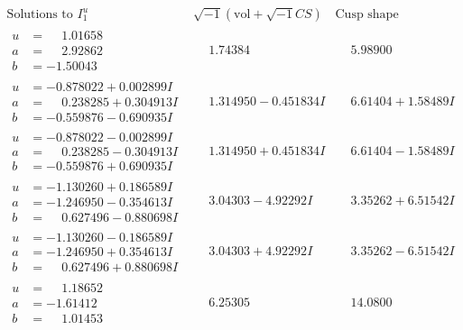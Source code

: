 \documentclass[1p]{elsarticle_modified}
\theoremstyle{definition}
\newcommand{\I}{\sqrt{-1}}
\begin{document}
$$\begin{array}{c|c|c}  
\text{Solutions to }I^u_{1}& \I (\text{vol} + \sqrt{-1}CS) & \text{Cusp shape}\\
 \hline 
\begin{aligned}
u &= \phantom{-}1.01658\phantom{ +0.000000I} \\
a &= \phantom{-}2.92862\phantom{ +0.000000I} \\
b &= -1.50043\phantom{ +0.000000I}\end{aligned}
 & \phantom{-}1.74384\phantom{ +0.000000I} & \phantom{-}5.98900\phantom{ +0.000000I} \\ \hline\begin{aligned}
u &= -0.878022 + 0.002899 I \\
a &= \phantom{-}0.238285 + 0.304913 I \\
b &= -0.559876 - 0.690935 I\end{aligned}
 & \phantom{-}1.314950 - 0.451834 I & \phantom{-}6.61404 + 1.58489 I \\ \hline\begin{aligned}
u &= -0.878022 - 0.002899 I \\
a &= \phantom{-}0.238285 - 0.304913 I \\
b &= -0.559876 + 0.690935 I\end{aligned}
 & \phantom{-}1.314950 + 0.451834 I & \phantom{-}6.61404 - 1.58489 I \\ \hline\begin{aligned}
u &= -1.130260 + 0.186589 I \\
a &= -1.246950 - 0.354613 I \\
b &= \phantom{-}0.627496 - 0.880698 I\end{aligned}
 & \phantom{-}3.04303 - 4.92292 I & \phantom{-}3.35262 + 6.51542 I \\ \hline\begin{aligned}
u &= -1.130260 - 0.186589 I \\
a &= -1.246950 + 0.354613 I \\
b &= \phantom{-}0.627496 + 0.880698 I\end{aligned}
 & \phantom{-}3.04303 + 4.92292 I & \phantom{-}3.35262 - 6.51542 I \\ \hline\begin{aligned}
u &= \phantom{-}1.18652\phantom{ +0.000000I} \\
a &= -1.61412\phantom{ +0.000000I} \\
b &= \phantom{-}1.01453\phantom{ +0.000000I}\end{aligned}
 & \phantom{-}6.25305\phantom{ +0.000000I} & \phantom{-}14.0800\phantom{ +0.000000I} \\ \hline\begin{aligned}

\end{aligned}
\end{array}$$
\end{document}
